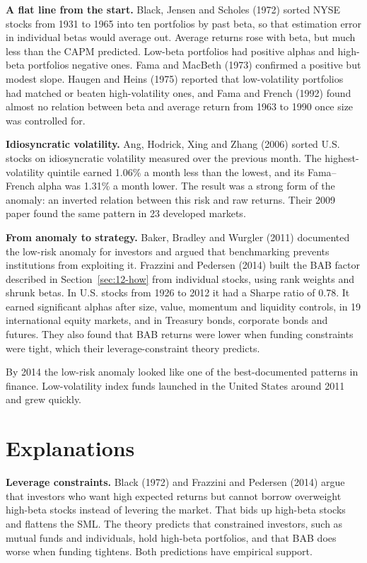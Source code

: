\textbf{A flat line from the start.} Black, Jensen and Scholes (1972) sorted NYSE stocks from 1931 to 1965 into ten portfolios by past beta, so that estimation error in individual betas would average out. Average returns rose with beta, but much less than the CAPM predicted. Low-beta portfolios had positive alphas and high-beta portfolios negative ones. Fama and MacBeth (1973) confirmed a positive but modest slope. Haugen and Heins (1975) reported that low-volatility portfolios had matched or beaten high-volatility ones, and Fama and French (1992) found almost no relation between beta and average return from 1963 to 1990 once size was controlled for.

\textbf{Idiosyncratic volatility.} Ang, Hodrick, Xing and Zhang (2006) sorted U.S. stocks on idiosyncratic volatility measured over the previous month. The highest-volatility quintile earned 1.06\% a month less than the lowest, and its Fama--French alpha was 1.31\% a month lower. The result was a strong form of the anomaly: an inverted relation between this risk and raw returns. Their 2009 paper found the same pattern in 23 developed markets.

\textbf{From anomaly to strategy.} Baker, Bradley and Wurgler (2011) documented the low-risk anomaly for investors and argued that benchmarking prevents institutions from exploiting it. Frazzini and Pedersen (2014) built the BAB factor described in Section~\ref{sec:12-how} from individual stocks, using rank weights and shrunk betas. In U.S. stocks from 1926 to 2012 it had a Sharpe ratio of 0.78. It earned significant alphas after size, value, momentum and liquidity controls, in 19 international equity markets, and in Treasury bonds, corporate bonds and futures. They also found that BAB returns were lower when funding constraints were tight, which their leverage-constraint theory predicts.

By 2014 the low-risk anomaly looked like one of the best-documented patterns in finance. Low-volatility index funds launched in the United States around 2011 and grew quickly.

\section{Explanations}
\label{sec:12-explanations}

\textbf{Leverage constraints.} Black (1972) and Frazzini and Pedersen (2014) argue that investors who want high expected returns but cannot borrow overweight high-beta stocks instead of levering the market. That bids up high-beta stocks and flattens the SML. The theory predicts that constrained investors, such as mutual funds and individuals, hold high-beta portfolios, and that BAB does worse when funding tightens. Both predictions have empirical support.

